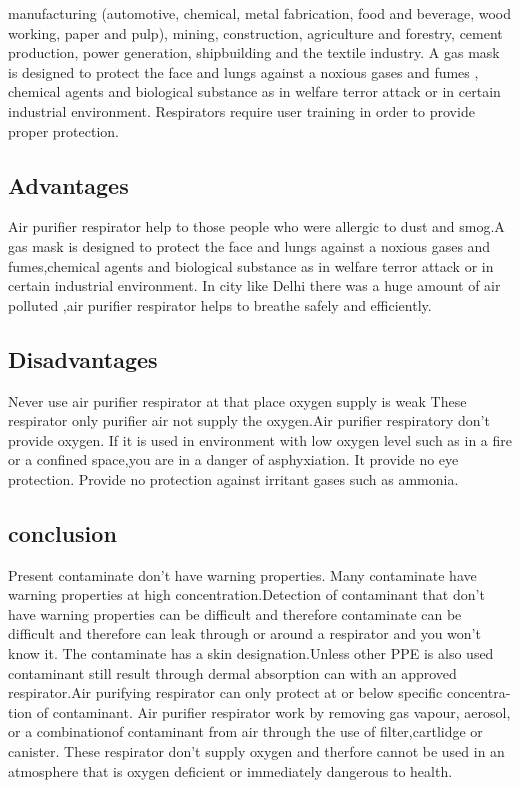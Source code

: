 \documentclass{article}
\begin{document}
manufacturing (automotive, chemical, metal fabrication, food and beverage,
wood working, paper and pulp), mining, construction, agriculture and forestry,
cement production, power generation, shipbuilding and the textile industry.
A gas mask is designed to protect the face and lungs against a noxious
gases and fumes , chemical agents and biological substance as in welfare
terror attack or in certain industrial environment.
Respirators require user training in order to provide proper protection.

\subsection{Advantages}







Air purifier respirator help to those people who were allergic to dust
and smog.A gas mask is designed to protect the face and lungs against a noxious
gases and fumes,chemical agents and biological substance as in welfare
terror attack or in certain industrial environment.
In city like Delhi there was a huge amount of air polluted ,air purifier
respirator helps to breathe safely and efficiently.
\clearpage



\subsection{Disadvantages}











Never use air purifier respirator at that place oxygen supply is weak These
respirator only purifier air not supply the oxygen.Air purifier respiratory don’t provide oxygen. If it is used in environment
with low oxygen level such as in a fire or a confined space,you are in a danger
of asphyxiation.
It provide no eye protection.
Provide no protection against irritant gases such as ammonia.


\subsection{conclusion}


Present contaminate don’t have warning properties. Many contaminate
have warning properties at high concentration.Detection of contaminant that
don’t have warning properties can be difficult and therefore contaminate can
be difficult and therefore can leak through or around a respirator and you
won’t know it.
The contaminate has a skin designation.Unless other PPE is also used
contaminant still result through dermal absorption can with an approved
respirator.Air purifying respirator can only protect at or below specific concentra-
tion of contaminant.
Air purifier respirator work by removing gas vapour, aerosol, or a combinationof contaminant from air through the use of filter,cartlidge or canister. These
respirator don’t supply oxygen and therfore cannot be used in an atmosphere
that is oxygen deficient or immediately dangerous to health.
\clearpage
\end{document}
